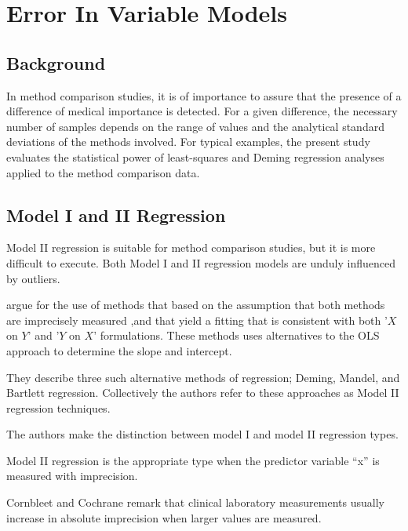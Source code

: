 \documentclass[12pt, a4paper]{report}
\theoremstyle{plain}
\theoremstyle{definition}
\theoremstyle{remark}
\begin{document}
	
	
	
	
	\section{Error In Variable Models}
	
	
	
	\subsection{Background} 
	In method comparison studies, it is of importance to assure that the presence of a difference of medical importance is detected. 
	For a given difference, the necessary number of samples depends on the range of values and the analytical standard deviations of the methods involved. For typical examples, the present study evaluates the statistical power of least-squares and Deming regression analyses applied to the method comparison data.
	
	
	
	
	
	
	\subsection{Model I and II Regression}
	

	
	Model II regression is suitable for method comparison studies, but it is more difficult to execute. Both Model I and II regression models are unduly influenced by outliers.
	
	
	
	\citet{CornCoch} argue for the use of methods that based on
	the assumption that both methods are imprecisely measured ,and
	that yield a fitting that is consistent with both '$X$ on $Y$' and
	'$Y$ on $X$' formulations. These methods uses alternatives to the
	OLS approach to determine the slope and intercept.
	
	They describe three such alternative methods of regression; Deming, Mandel, and Bartlett regression. Collectively the authors refer to these approaches as Model II regression techniques.
	
	The authors make the distinction between model I and model II regression types.
	
	Model II regression is the appropriate type when the predictor variable “x” is measured with imprecision.
	
	Cornbleet and Cochrane remark that clinical laboratory measurements usually increase in absolute imprecision when larger values are measured.
	
\end{document}
